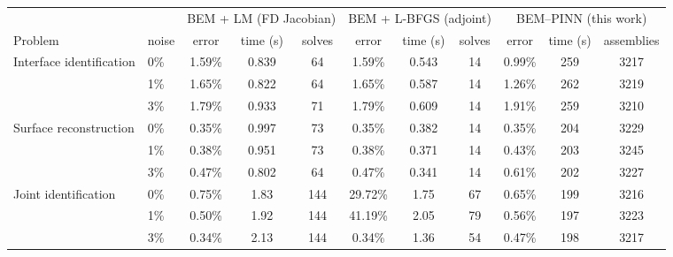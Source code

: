 \begin{tabular}{llccccccccc}
\toprule
 & & \multicolumn{3}{c}{BEM + LM (FD Jacobian)} & \multicolumn{3}{c}{BEM + L-BFGS (adjoint)} & \multicolumn{3}{c}{BEM--PINN (this work)}\\
\cmidrule(lr){3-5}\cmidrule(lr){6-8}\cmidrule(lr){9-11}
Problem & noise & error & time (s) & solves & error & time (s) & solves & error & time (s) & assemblies\\
\midrule
Interface identification & 0\% & 1.59\% & 0.839 & 64 & 1.59\% & 0.543 & 14 & 0.99\% & 259 & 3217\\
 & 1\% & 1.65\% & 0.822 & 64 & 1.65\% & 0.587 & 14 & 1.26\% & 262 & 3219\\
 & 3\% & 1.79\% & 0.933 & 71 & 1.79\% & 0.609 & 14 & 1.91\% & 259 & 3210\\
\addlinespace
Surface reconstruction & 0\% & 0.35\% & 0.997 & 73 & 0.35\% & 0.382 & 14 & 0.35\% & 204 & 3229\\
 & 1\% & 0.38\% & 0.951 & 73 & 0.38\% & 0.371 & 14 & 0.43\% & 203 & 3245\\
 & 3\% & 0.47\% & 0.802 & 64 & 0.47\% & 0.341 & 14 & 0.61\% & 202 & 3227\\
\addlinespace
Joint identification & 0\% & 0.75\% & 1.83 & 144 & 29.72\% & 1.75 & 67 & 0.65\% & 199 & 3216\\
 & 1\% & 0.50\% & 1.92 & 144 & 41.19\% & 2.05 & 79 & 0.56\% & 197 & 3223\\
 & 3\% & 0.34\% & 2.13 & 144 & 0.34\% & 1.36 & 54 & 0.47\% & 198 & 3217\\
\bottomrule
\end{tabular}
